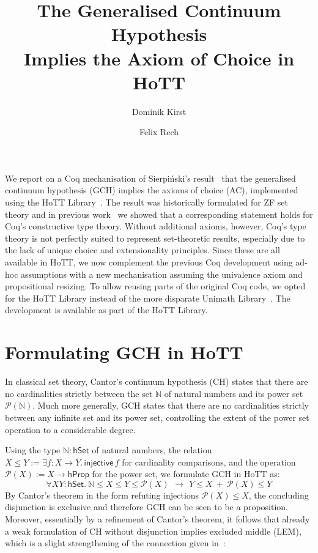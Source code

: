 \documentclass{easychair}
\title{The Generalised Continuum Hypothesis\\Implies the Axiom of Choice in HoTT}
\author{Dominik Kirst \and Felix Rech}
\institute{Saarland University, Saarland Informatics Campus, Germany}
\newcommand{\nat}{\mathbb{N}}
\newcommand{\pow}{\mathcal{P}}
\newcommand{\hprop}{\mathsf{hProp}}
\newcommand{\hset}{\mathsf{hSet}}
\begin{document}
\maketitle

We report on a Coq mechanisation of Sierpi\'nski's result~\cite{sierpinski1947hypothese} that the generalised continuum hypothesis (GCH) implies the axioms of choice (AC), implemented using the HoTT Library~\cite{bauer2017hott}.
The result was historically formulated for ZF set theory and in previous work~\cite{kirst2021generalised} we showed that a corresponding statement holds for Coq's constructive type theory.
Without additional axioms, however, Coq's type theory is not perfectly suited to represent set-theoretic results, especially due to the lack of unique choice and extensionality principles.
Since these are all available in HoTT, we now complement the previous Coq development using ad-hoc assumptions with a new mechanisation assuming the univalence axiom and propositional resizing.
To allow reusing parts of the original Coq code, we opted for the HoTT Library instead of the more disparate Unimath Library~\cite{UniMath}.
The development is available as part of the HoTT Library.

\section{Formulating GCH in HoTT}

In classical set theory, Cantor's continuum hypothesis (CH) states that there are no cardinalities strictly between the set $\nat$ of natural numbers and its power set $\pow(\nat)$.
Much more generally, GCH states that there are no cardinalities strictly between any infinite set and its power set, controlling the extent of the power set operation to a considerable degree.

Using the type $\nat:\hset$ of natural numbers, the relation $X\le Y:=\exists f:X\to Y.\, \mathsf{injective}\,f$ for cardinality comparisons, and the operation $\pow(X):=X\to\hprop$ for the power set, we formulate GCH in HoTT as:
$$\forall X Y:\hset.~\nat \le X\le Y\le \pow(X)~\,\to~\, Y\le X ~+~ \pow(X)\le Y$$
By Cantor's theorem in the form refuting injections $\pow(X)\le X$, the concluding disjunction is exclusive and therefore GCH can be seen to be a proposition.
Moreover, essentially by a refinement of Cantor's theorem, it follows that already a weak formulation of CH without disjunction implies excluded middle (LEM), which is a slight strengthening of the connection given in~\cite{bridges2016continuum}:
\end{document}
